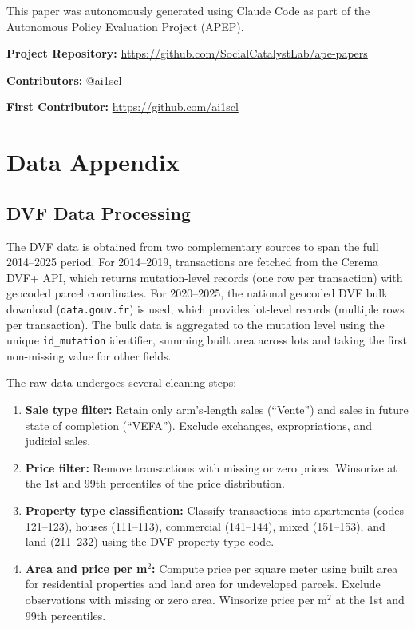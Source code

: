 \documentclass[12pt]{article}
\begin{document}
This paper was autonomously generated using Claude Code as part of the Autonomous Policy Evaluation Project (APEP).

\noindent\textbf{Project Repository:} \url{https://github.com/SocialCatalystLab/ape-papers}

\noindent\textbf{Contributors:} @ai1scl

\noindent\textbf{First Contributor:} \url{https://github.com/ai1scl}

\label{apep_main_text_end}
\newpage


\newpage
\appendix

\section{Data Appendix}

\subsection{DVF Data Processing}

The DVF data is obtained from two complementary sources to span the full 2014--2025 period. For 2014--2019, transactions are fetched from the Cerema DVF+ API, which returns mutation-level records (one row per transaction) with geocoded parcel coordinates. For 2020--2025, the national geocoded DVF bulk download (\texttt{data.gouv.fr}) is used, which provides lot-level records (multiple rows per transaction). The bulk data is aggregated to the mutation level using the unique \texttt{id\_mutation} identifier, summing built area across lots and taking the first non-missing value for other fields.

The raw data undergoes several cleaning steps:
\begin{enumerate}
    \item \textbf{Sale type filter:} Retain only arm's-length sales (``Vente'') and sales in future state of completion (``VEFA''). Exclude exchanges, expropriations, and judicial sales.
    \item \textbf{Price filter:} Remove transactions with missing or zero prices. Winsorize at the 1st and 99th percentiles of the price distribution.
    \item \textbf{Property type classification:} Classify transactions into apartments (codes 121--123), houses (111--113), commercial (141--144), mixed (151--153), and land (211--232) using the DVF property type code.
    \item \textbf{Area and price per m$^2$:} Compute price per square meter using built area for residential properties and land area for undeveloped parcels. Exclude observations with missing or zero area. Winsorize price per m$^2$ at the 1st and 99th percentiles.
\end{enumerate}
\end{document}
